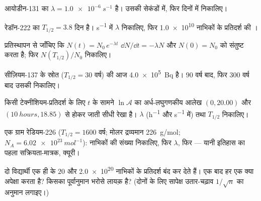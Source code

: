 \begin{exercise}[$\star$]\label{exo:g12:radioactive-decay:1}
आयोडीन-131 का $\lambda = \qty{1.0e-6}{s^{-1}}$ है। उसकी  सेकंडों में, फिर दिनों में
निकालिए।
\end{exercise}

\begin{exercise}[$\star$]\label{exo:g12:radioactive-decay:2}
रेडॉन-222 का $T_{1/2} = 3.8$ दिन है। \unit{s^{-1}} में $\lambda$ निकालिए, फिर \num{1.0e10} नाभिकों
के प्रतिदर्श की ।
\end{exercise}

\begin{exercise}[$\star$]\label{exo:g12:radioactive-decay:3}
प्रतिस्थापन से जाँचिए कि $N(t) = N_0\,e^{-\lambda t}$ $\dd N/\dd t = -\lambda N$ और $N(0) = N_0$ को संतुष्ट करता है; फिर
$N(T_{1/2})/N_0$ निकालिए।
\end{exercise}

\begin{exercise}[$\star$]\label{exo:g12:radioactive-decay:4}
सीज़ियम-137 के स्रोत ($T_{1/2} = 30$ वर्ष) की  आज \qty{4.0e5}{Bq} है।
$90$ वर्ष बाद, फिर $300$ वर्ष बाद उसकी  निकालिए।
\end{exercise}

\begin{exercise}[$\star$]\label{exo:g12:radioactive-decay:5}
किसी टेक्नीशियम-प्रतिदर्श के लिए $t$ के सामने $\ln \mathcal A$ का अर्ध-लघुगणकीय
आलेख $(0, 20.00)$ और $(\qty{10}{hours}, 18.85)$ से होकर जाती सीधी रेखा है। $\lambda$ (\unit{h^{-1}} और \unit{s^{-1}}
में) तथा $T_{1/2}$ निकालिए।
\end{exercise}

\begin{exercise}[$\star\star$]\label{exo:g12:radioactive-decay:6}
एक ग्राम रेडियम-226 ($T_{1/2} = 1600$ वर्ष; मोलर द्रव्यमान \qty{226}{g/mol}; $N_A = \qty{6.02e23}{mol^{-1}}$): नाभिकों
की संख्या निकालिए, फिर $\lambda$, फिर  --- यानी इतिहास का पहला
सक्रियता-मात्रक, क्यूरी।
\end{exercise}

\begin{exercise}[$\star\star$]\label{exo:g12:radioactive-decay:7}
दो विद्यार्थी एक ही  के $20$ और \num{2.0e20} नाभिकों के
प्रतिदर्श बंद कर देते हैं। एक  बाद हर एक क्या अपेक्षा करता है?
किसका पूर्वानुमान भरोसे लायक़ है? (दोनों के लिए सापेक्ष उतार-चढ़ाव $1/\sqrt n$ का
अनुमान लगाइए।)
\end{exercise}

